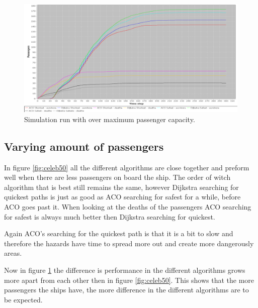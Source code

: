 \begin{figure} [h]
\centering
\hspace*{-1.0in}
\includegraphics[scale=0.35]{images/Graph-using-200-rounds-200-passangers.png}
\caption{Simulation run with over maximum passenger capacity.}
\label{fig:celeb200}
\end{figure}

\subsection{Varying amount of passengers}

In figure \ref{fig:celeb50} all the different algorithms are close together and preform well when there are less passengers on board the ship. The order of witch algorithm that is best still remains the same, however Dijkstra searching for quickest paths is just as good as ACO searching for safest for a while, before ACO goes past it. When looking at the deaths of the passengers ACO searching for safest is always much better then Dijkstra searching for quickest.

Again ACO's searching for the quickest path is that it is a bit to slow and therefore the hazards have time to spread more out and create more dangerously areas.

Now in figure \ref{fig:celeb200} the difference is performance in the different algorithms grows more apart from each other then in figure \ref{fig:celeb50}. This shows that the more passengers the ships have, the more difference in the different algorithms are to be expected.

